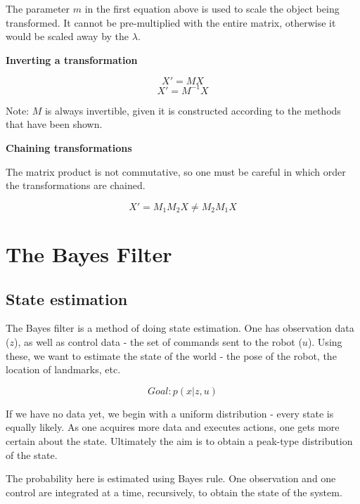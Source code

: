 \documentclass[a4paper]{article}
\begin{document}
The parameter $m$ in the first equation above is used to scale the object being transformed. It cannot be pre-multiplied with the entire matrix, otherwise it would be scaled away by the $\lambda$.

\textbf{Inverting a transformation}

\begin{equation*}
    X' = MX
\end{equation*}
\begin{equation*}
    X' = M^{-1}X
\end{equation*}

Note: $M$ is always invertible, given it is constructed according to the methods that have been shown.

\textbf{Chaining transformations}

The matrix product is not commutative, so one must be careful in which order the transformations are chained.

\begin{equation*}
    X' = M_1M_2X \neq M_2M_1X
\end{equation*}

\pagebreak


\section {The Bayes Filter}

\subsection{State estimation}

The Bayes filter is a method of doing state estimation. One has observation data ($z$), as well as control data - the set of commands sent to the robot ($u$). Using these, we want to estimate the state of the world - the pose of the robot, the location of landmarks, etc.

\begin{equation*}
    Goal: p(x| z,u)
\end{equation*}

If we have no data yet, we begin with a uniform distribution - every state is equally likely. As one acquires more data and executes actions, one gets more certain about the state. Ultimately the aim is to obtain a peak-type distribution of the state.

The probability here is estimated using Bayes rule. One observation and one control are integrated at a time, recursively, to obtain the state of the system.
\end{document}
